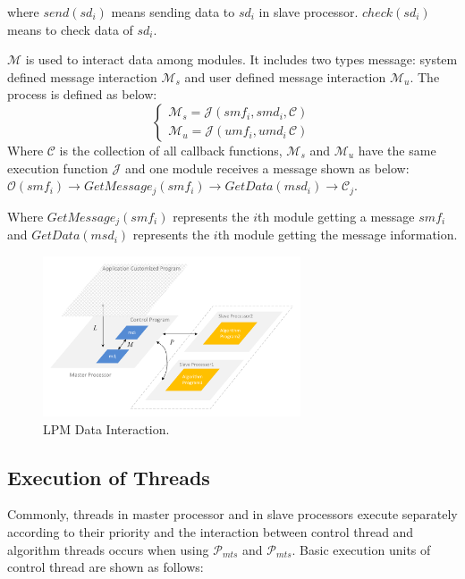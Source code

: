 \documentclass[journal,UTF8]{IEEEtran}
\begin{document}
 where $send(sd_i)$ means sending data to $sd_i$ in slave processor. $check(sd_i)$ means to check data of $sd_i$.
 
$\mathcal{M}$ is used to interact data among modules. It includes two types message: system defined message interaction $\mathcal{M}_{s}$ and user defined message interaction $\mathcal{M}_{u}$. The process is defined as below:
 \begin{equation}
\left\{
\begin{array}{l}
\mathcal{M}_{s} = \mathcal{J} (smf_i,smd_i,\mathcal{C})\\
\mathcal{M}_{u} = \mathcal{J} (umf_i,umd_i\,\mathcal{C})
\end{array}
\right.
\end{equation}
Where $\mathcal{C}$ is the collection of all callback functions, $\mathcal{M}_{s}$ and $\mathcal{M}_{u}$ have the same execution function $\mathcal{J}$ and one module receives a message shown as below:
$\mathcal{O}(smf_i)\to GetMessage_{j}(smf_i)\to GetData(msd_i)\to\mathcal{C}_j$.

Where $GetMessage_{j}(smf_i)$ represents the $i$th module getting a message $smf_i$ and $GetData(msd_i)$ represents the $i$th module getting the message information.

 \begin{figure}
	\centering
	\includegraphics[width=3in]{fig/Interaction.pdf}
	\caption{ LPM Data Interaction.}
	\label{fig:Interaction}
\end{figure}

 \subsection{Execution of Threads}
 Commonly, threads in master processor and in slave processors execute separately according to their priority and the interaction between control thread and algorithm threads occurs when using $\mathcal{P}_{mts}$ and $\mathcal{P}_{mts}$. Basic execution units of control thread are shown as follows:
 
\end{document}
